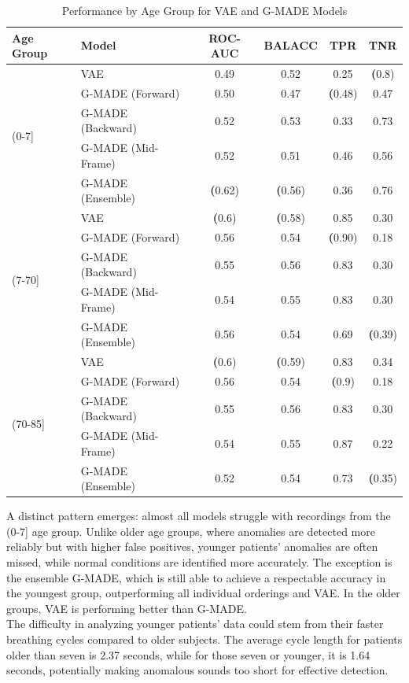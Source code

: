 \begin{table}[h!]
    \centering
    \caption{Performance by Age Group for VAE and G-MADE Models}
    \begin{tabular}{|l|l|c|c|c|c|}
    \hline
    \textbf{Age Group} & \textbf{Model} & \textbf{ROC-AUC} & \textbf{BALACC} & \textbf{TPR} & \textbf{TNR} \\
    \hline
    \multirow{5}{*}{(0-7]} 
    & VAE & 0.49 & 0.52 & 0.25 & \textbf(0.8) \\
    & G-MADE (Forward) & 0.50 & 0.47 & \textbf(0.48) & 0.47 \\
    & G-MADE (Backward) & 0.52 & 0.53 & 0.33 & 0.73 \\
    & G-MADE (Mid-Frame) & 0.52 & 0.51 & 0.46 & 0.56 \\
    & G-MADE (Ensemble) & \textbf(0.62) & \textbf(0.56) & 0.36 & 0.76 \\
    \hline
    \multirow{5}{*}{(7-70]} 
    & VAE & \textbf(0.6) & \textbf(0.58) & 0.85 & 0.30 \\
    & G-MADE (Forward) & 0.56 & 0.54 & \textbf(0.90) & 0.18 \\
    & G-MADE (Backward) & 0.55 & 0.56 & 0.83 & 0.30 \\
    & G-MADE (Mid-Frame) & 0.54 & 0.55 & 0.83 & 0.30 \\
    & G-MADE (Ensemble) & 0.56 & 0.54 & 0.69 & \textbf(0.39) \\
    \hline
    \multirow{5}{*}{(70-85]} 
    & VAE & \textbf(0.6) & \textbf(0.59) & 0.83 & 0.34 \\
    & G-MADE (Forward) & 0.56 & 0.54 & \textbf(0.9) & 0.18 \\
    & G-MADE (Backward) & 0.55 & 0.56 & 0.83 & 0.30 \\
    & G-MADE (Mid-Frame) & 0.54 & 0.55 & 0.87 & 0.22 \\
    & G-MADE (Ensemble) & 0.52 & 0.54 & 0.73 & \textbf(0.35) \\
    \hline
    \end{tabular}
\end{table}

A distinct pattern emerges: almost all models struggle with recordings from the (0-7] age group. Unlike older age groups, where anomalies are detected more reliably but with higher false positives, younger patients' anomalies are often missed, while normal conditions are identified more accurately. The exception is the ensemble G-MADE, which is still able to achieve a respectable accuracy in the youngest group, outperforming all individual orderings and VAE. In the older groups, VAE is performing better than G-MADE.\\
The difficulty in analyzing younger patients' data could stem from their faster breathing cycles compared to older subjects. The average cycle length for patients older than seven is 2.37 seconds, while for those seven or younger, it is 1.64 seconds, potentially making anomalous sounds too short for effective detection.

